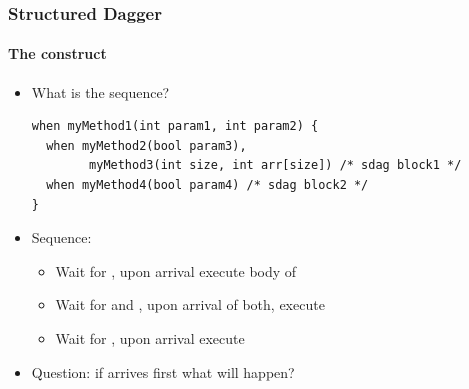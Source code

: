 \documentclass{beamer}
\begin{document}
\begin{frame}[fragile]
  \frametitle{Structured Dagger}
  \framesubtitle{The  construct}
\begin{itemize}
  \item What is the sequence?
  \begin{lstlisting}[basicstyle=\scriptsize]
when myMethod1(int param1, int param2) {
  when myMethod2(bool param3),
        myMethod3(int size, int arr[size]) /* sdag block1 */
  when myMethod4(bool param4) /* sdag block2 */
}
  \end{lstlisting}
  \pause
  \item Sequence:
    \begin{itemize}
      \item Wait for , upon arrival execute body of 
        \pause
      \item Wait for  and , upon arrival of
        both, execute 
        \pause
      \item Wait for , upon arrival execute 
    \end{itemize}
  \item Question: if  arrives first what will happen?
\end{itemize}

\end{frame}


\end{document}
